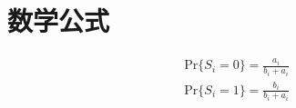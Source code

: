 ﻿
\chapter{数学公式}
\label{chap:math}
\begin{equation}
\begin{split}
\mbox{Pr}\{S_i=0\}=\frac{a_i}{b_i+a_i} \\
\mbox{Pr}\{S_i=1\}=\frac{b_i}{b_i+a_i} \label{1}
\end{split}
\end{equation}
\cite{lshort-cn}
